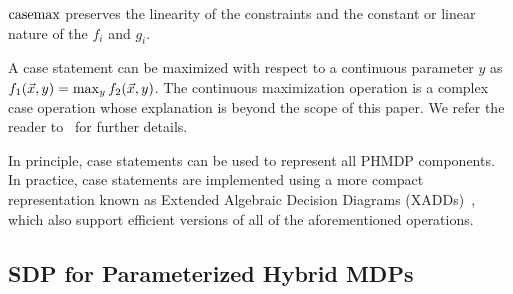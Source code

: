 $\mathrm{casemax}$ preserves the linearity of the constraints and the constant or linear nature of the {\footnotesize$f_i$} and {\footnotesize$g_i$}. 

A case statement can be maximized with respect to a continuous parameter {\footnotesize$y$} as {\footnotesize $ f_1(\vec{x}, y) = \contmax_{y}f_2(\vec{x}, y) $}. The continuous maximization operation is a complex case operation whose explanation is beyond the scope of this paper. We refer the reader to~\parencite{Zamani_AAAI_2012} for further details.

In principle, case statements can be used to represent all PHMDP components. In practice, case statements are implemented using a more compact representation known as Extended Algebraic Decision Diagrams (XADDs)~\parencite{Sanner_UAI_2011}, which also support efficient versions of all of the aforementioned operations. 

%


\subsection{SDP for Parameterized Hybrid MDPs}

